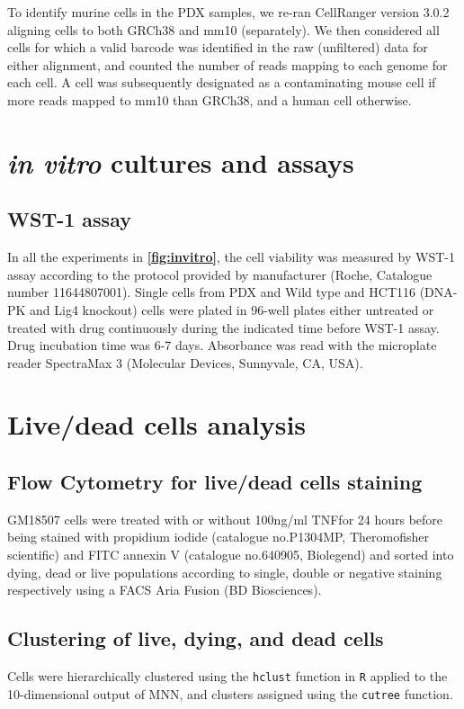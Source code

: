 To identify murine cells in the PDX samples, we re-ran CellRanger version 3.0.2 aligning cells to both GRCh38 and mm10 (separately). We then considered all cells for which a valid barcode was identified in the raw (unfiltered) data for either alignment, and counted the number of reads mapping to each genome for each cell. A cell was subsequently designated as a contaminating mouse cell if more reads mapped to mm10 than GRCh38, and a human cell otherwise.

\section{\textit{in vitro} cultures and assays}

\subsection{WST-1 assay}
In all the experiments in \textbf{\autoref{fig:invitro}}, the cell viability was measured by WST-1 assay according to the protocol provided by manufacturer (Roche, Catalogue number 11644807001). Single cells from PDX and Wild type and HCT116 (DNA-PK and Lig4 knockout) cells were plated in 96-well plates either untreated or treated with drug continuously during the indicated time before WST-1 assay. Drug incubation time was 6-7 days. Absorbance was read with the microplate reader SpectraMax 3 (Molecular Devices, Sunnyvale, CA, USA).


\section{Live/dead cells analysis}

\subsection{Flow Cytometry for live/dead cells staining}
 GM18507 cells were treated with or without 100ng/ml TNF\textalpha for 24 hours before being stained with propidium iodide (catalogue no.P1304MP, Theromofisher scientific) and FITC annexin V (catalogue no.640905, Biolegend) and sorted into dying, dead or live populations according to single, double or negative staining respectively using a FACS Aria Fusion (BD Biosciences).
 
\subsection{Clustering of live, dying, and dead cells}
Cells were hierarchically clustered using the \texttt{hclust} function in \texttt{R} applied to the 10-dimensional output of MNN, and clusters assigned using the \texttt{cutree} function.

